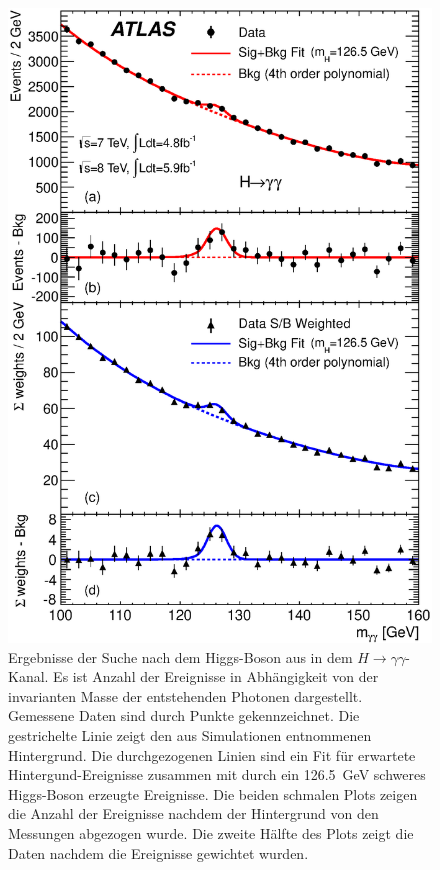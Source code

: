 \begin{figure}
\includegraphics[scale = 0.5]{input/mggweighted_panel_nonorm.eps}\caption{Ergebnisse der Suche nach dem Higgs-Boson aus \cite{Aad:2012tfa} in dem $H \rightarrow \gamma\gamma$-Kanal. Es ist Anzahl der Ereignisse in Abhängigkeit von der invarianten Masse der entstehenden Photonen dargestellt. Gemessene Daten sind durch Punkte gekennzeichnet. Die gestrichelte Linie zeigt den aus Simulationen entnommenen Hintergrund. Die durchgezogenen Linien sind ein Fit für erwartete Hintergund-Ereignisse zusammen mit durch ein 126.5~GeV schweres Higgs-Boson erzeugte Ereignisse. Die beiden schmalen Plots zeigen die Anzahl der Ereignisse nachdem der Hintergrund von den Messungen abgezogen wurde. Die zweite Hälfte des Plots zeigt die Daten nachdem die Ereignisse gewichtet wurden.}\label{fig:higgsdiscovery}
\end{figure}


